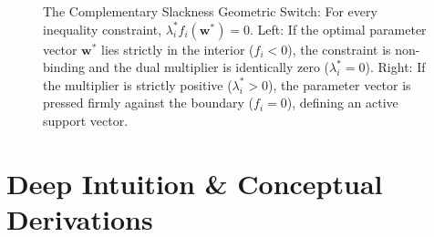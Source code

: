 \begin{figure}[htbp]
\caption{The Complementary Slackness Geometric Switch: For every inequality constraint, $\lambda_i^* f_i(\mathbf{w}^*) = 0$. Left: If the optimal parameter vector $\mathbf{w}^*$ lies strictly in the interior ($f_i < 0$), the constraint is non-binding and the dual multiplier is identically zero ($\lambda_i^* = 0$). Right: If the multiplier is strictly positive ($\lambda_i^* > 0$), the parameter vector is pressed firmly against the boundary ($f_i = 0$), defining an active support vector.}
\label{fig:slackness_switch}
\end{figure}

\section{Deep Intuition \& Conceptual Derivations}

